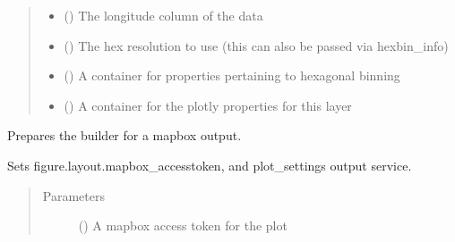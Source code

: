 \documentclass[letterpaper,10pt,english]{sphinxmanual}
\begin{document}
\begin{fulllineitems}
\begin{fulllineitems}
\begin{quote}
\begin{description}
\begin{itemize}
\item {} 
\sphinxAtStartPar
{} () \textendash{} The longitude column of the data

\item {} 
\sphinxAtStartPar
{} () \textendash{} The hex resolution to use (this can also be passed via hexbin\_info)

\item {} 
\sphinxAtStartPar
{} () \textendash{} A container for properties pertaining to hexagonal binning

\item {} 
\sphinxAtStartPar
{} () \textendash{} A container for the plotly properties for this layer

\end{itemize}

\end{description}\end{quote}

\end{fulllineitems}


\begin{fulllineitems}
\label{\detokenize{builder:geohexviz.builder.PlotBuilder.set_mapbox}}
\sphinxAtStartPar
Prepares the builder for a mapbox output.

\sphinxAtStartPar
Sets figure.layout.mapbox\_accesstoken, and plot\_settings output service.
\begin{quote}\begin{description}
\item[{Parameters}] \leavevmode
\sphinxAtStartPar
{} () \textendash{} A mapbox access token for the plot

\end{description}\end{quote}


\end{fulllineitems}
\end{fulllineitems}
\end{document}
